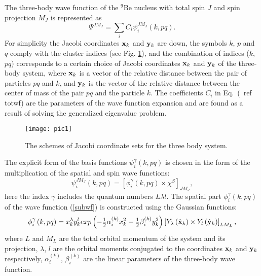 \documentclass[
12pt, %
oneside, %
english, %
onehalfspacing, %
onehalfspacing, %
headsepline, %
]{MastersDoctoralThesis} %
\begin{document}
 The three-body wave function of the $^9$Be nucleus with total spin $ J $ and spin projection $ M_J $ is represented as
 \begin{equation}
 \Psi^{JM_J}= \sum_{i} C_{i} \psi_{i}^{JM_J} \left( k,pq \right).
 \label{totwf}
 \end{equation}
For simplicity the Jacobi coordinates $ {\bf x}_k $ and $ {\bf y}_k $ are down, the symbols $ k $, $ p $ and $ q $ comply with the cluster indices (see Fig. \ref{fig:jacobiSet}), and the combination of indices ($ k $, $ pq $) corresponds to a certain choice of Jacobi coordinates $ {\bf x}_k $ and $ {\bf y}_k $ of the three-body system, where $ {\bf x}_k $ is a vector of the relative distance between the pair of particles $ pq $ and $ k $, and $ {\bf y}_k $ is the vector of the relative distance between the center of mass of the pair $ pq $ and the particle $ k $. 
The coefficients $ C_{i} $ in Eq.~(\ ref {totwf}) are the parameters of the wave function expansion and are found as a result of solving the generalized eigenvalue problem. 

\begin{figure}[b]
\centering
\texttt{[image: pic1]}
\decoRule
\caption{\footnotesize The schemes of Jacobi coordinate sets for the three body system.}
\label{fig:jacobiSet}
\end{figure}

The explicit form of the basis functions $ \psi_{i}^{\gamma} \left(k, pq \right) $ is chosen in the form of the multiplication of the spatial and spin wave functions:
\begin{equation}
\psi_{i}^{JM_J}\left(k, pq \right) = \left[ \phi_{i}^{\gamma} \left(k, pq \right) 
\times \chi^{S} \right] _{JM_{J}},
\label{subwf}
\end{equation}
here the index $\gamma$ includes the quantum numbers $L \lambda l$. The spatial part $\phi_{i}^{\gamma} \left(k, pq \right) $ of the wave function (\ref {subwf}) is constructed using the Gaussian functions:
 \begin{equation}
 \phi_{i}^{\gamma} \left(k, pq \right) =
 x_{k}^{\lambda} y_{k}^{l} exp\left(- \tfrac{1}{2}\alpha^{(k)}_{i} x_{k}^{2} - \tfrac{1}{2} \beta^{(k)}_{i}  y_{k}^{2} \right) 
 \left[ Y_\lambda \left(  \hat{ \bf x}_k \right) \times Y_l \left( \hat{\bf y}_k \right) \right]_{LM_L},
 \label{radial_wf}
 \end{equation}
where $ L $ and $ M_L $ are the total orbital momentum of the system and its projection, $ \lambda $, $ l $ are the orbital moments conjugated to the coordinates $ {\bf x} _k $ and $ {\bf y} _k $ respectively, $ \alpha^{(k)} _ {i} $, $ \beta^{(k)}_{i}$ are the linear parameters of the three-body wave function.
\end{document}
